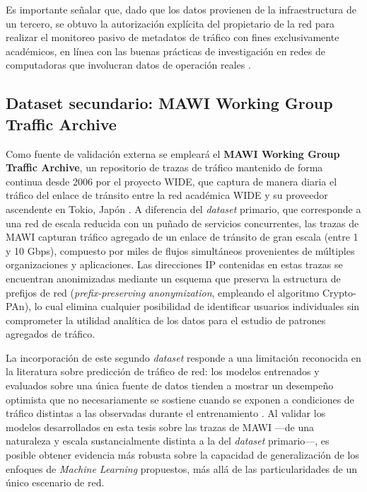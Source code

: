 \documentclass[12pt]{report}
\begin{document}
Es importante señalar que, dado que los datos provienen de la infraestructura de un tercero, se obtuvo la autorización explícita del propietario de la red para realizar el monitoreo pasivo de metadatos de tráfico con fines exclusivamente académicos, en línea con las buenas prácticas de investigación en redes de computadoras que involucran datos de operación reales \cite{boukerche2021}.

\subsection*{Dataset secundario: MAWI Working Group Traffic Archive}

Como fuente de validación externa se empleará el \textbf{MAWI Working Group Traffic Archive}, un repositorio de trazas de tráfico mantenido de forma continua desde 2006 por el proyecto WIDE, que captura de manera diaria el tráfico del enlace de tránsito entre la red académica WIDE y su proveedor ascendente en Tokio, Japón \cite{mawi}. A diferencia del \textit{dataset} primario, que corresponde a una red de escala reducida con un puñado de servicios concurrentes, las trazas de MAWI capturan tráfico agregado de un enlace de tránsito de gran escala 
(entre 1 y 10 Gbps), compuesto por miles de flujos simultáneos provenientes de múltiples organizaciones y aplicaciones. Las direcciones IP contenidas en estas trazas se encuentran anonimizadas mediante un esquema que preserva la estructura de prefijos de red (\textit{prefix-preserving anonymization}, empleando el algoritmo Crypto-PAn), lo cual elimina cualquier posibilidad de identificar usuarios individuales sin comprometer la utilidad analítica de los datos para el estudio de patrones agregados de tráfico.

La incorporación de este segundo \textit{dataset} responde a una limitación reconocida en la literatura sobre predicción de tráfico de red: los modelos entrenados y evaluados sobre una única fuente de datos tienden a mostrar un desempeño optimista que no necesariamente se sostiene cuando se exponen a condiciones de tráfico distintas a las observadas durante el entrenamiento \cite{zhang2020}. Al validar los modelos desarrollados en esta tesis sobre las trazas de MAWI ---de una naturaleza y escala sustancialmente distinta a la del \textit{dataset} 
primario---, es posible obtener evidencia más robusta sobre la capacidad de generalización de los enfoques de \textit{Machine Learning} propuestos, más allá de las particularidades de un único escenario de red.
\end{document}
